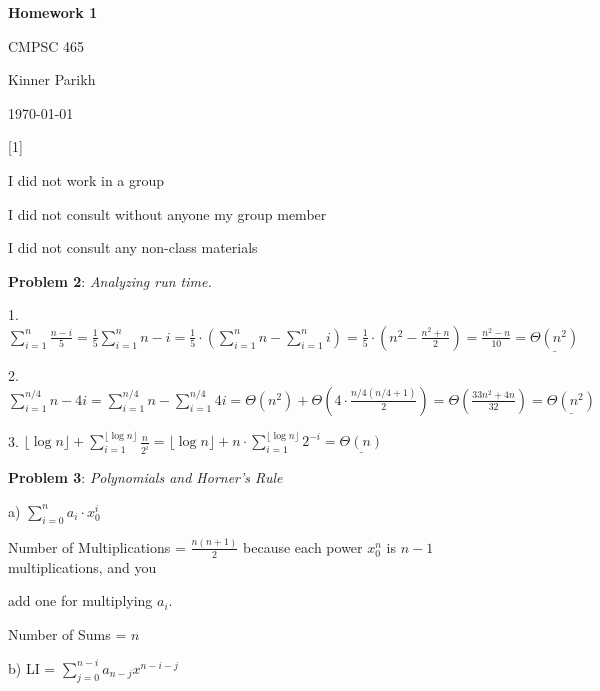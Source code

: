 \documentclass{article} %
\newcommand{\question}[2][]{\begin{flushleft}
        \textbf{Problem #1}: \textit{#2}

\end{flushleft}}
\newcommand{\maketitletwo}[2][]{\begin{center}
        \Large{\textbf{Homework #1}
            
            CMPSC 465} %
        \vspace{5pt}
        
        \normalsize{Kinner Parikh  %
        
        \today}        %
        \vspace{40pt}


        \newpage
        
\end{center}}
\begin{document}
    \maketitletwo[1]  %

    \question[1]{}
    \begin{center}
        
        I did not work in a group
    
        I did not consult without anyone my group member
    
        I did not consult any non-class materials
    \end{center}
    
    \newpage

    \question[2]{Analyzing run time.}

    1. $\sum^{n}_{i = 1} \frac{n-i}{5} = \frac{1}{5}\sum^{n}_{i = 1} n - i = \frac{1}{5} \cdot (\sum^{n}_{i = 1} n  - \sum^{n}_{i = 1} i) = \frac{1}{5} \cdot (n^2 - \frac{n^2 + n}{2}) = \frac{n^2 - n}{10} = \underline{\Theta(n^2)}$

    \vspace*{10 pt}

    2. $\sum^{n/4}_{i = 1} n - 4i = \sum^{n/4}_{i = 1} n - \sum^{n/4}_{i = 1} 4i = \Theta(n^2) + \Theta(4 \cdot \frac{n/4 (n/4 + 1)}{2}) = \Theta(\frac{33n^2 + 4n}{32}) = \underline{\Theta(n^2)}$

    \vspace*{10pt}

    3. $\lfloor \log n \rfloor + \sum^{\lfloor \log n \rfloor}_{i = 1} \frac{n}{2^i} = \lfloor \log n \rfloor + n \cdot \sum^{\lfloor \log n \rfloor}_{i = 1} 2^{-i} = \underline{\Theta(n)}$

    \newpage

    \question[3]{Polynomials and Horner's Rule}

    a) $\sum^{n}_{i = 0} a_i \cdot x_0^i$
    
    \hspace{12pt}Number of Multiplications = $\frac{n(n + 1)}{2}$ because each power $x^n_0$ is $n - 1$ multiplications, and you 
    
    \hspace{12pt}add one for multiplying $a_i$.
    
    \hspace{12pt}Number of Sums = $n$

    \vspace{5pt}
    

    b) LI = $\sum^{n - i}_{j = 0} a_{n - j}x^{n - i - j}$
\end{document}

